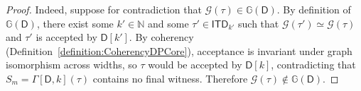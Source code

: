 \documentclass[11pt,a4paper]{article}
\newcommand{\treewidthvalue}{k}
\newcommand{\decompositiongraph}[1]{\mathcal{G}(#1)}
\newcommand{\N}{\mathbb{N}}
\newcommand{\allabstractdecompositionstreewidth}[1]{\mathsf{ITD}_{#1}}
\newcommand{\abstractdecomposition}{\tau}
\newcommand{\dpcoregraphproperty}[1]{\mathbb{G}(#1)}
\newcommand{\dpcore}{\mathsf{D}}
\newcommand{\witnessset}{S}
\newcommand{\dynamizationfunctionname}[1]{\Gamma[{#1}]}
\newcommand{\dynamizationfunction}[2]{\dynamizationfunctionname{#1,#2}}
\begin{document}
\begin{proof}
	Indeed, suppose for contradiction that $\decompositiongraph{\abstractdecomposition}\in \dpcoregraphproperty{\dpcore}$.
	By definition of $\dpcoregraphproperty{\dpcore}$, there exist some $\treewidthvalue'\in\N$ and some $\abstractdecomposition'\in \allabstractdecompositionstreewidth{\treewidthvalue'}$ such that $\decompositiongraph{\abstractdecomposition'}\simeq \decompositiongraph{\abstractdecomposition}$ and $\abstractdecomposition'$ is accepted by $\dpcore[\treewidthvalue']$.
	By coherency (Definition~\ref{definition:CoherencyDPCore}), acceptance is invariant under graph isomorphism across widths, so $\abstractdecomposition$ would be accepted by $\dpcore[\treewidthvalue]$, contradicting that $\witnessset_m=\dynamizationfunction{\dpcore}{\treewidthvalue}(\abstractdecomposition)$ contains no final witness.
	Therefore $\decompositiongraph{\abstractdecomposition}\notin \dpcoregraphproperty{\dpcore}$.



\end{proof}
\end{document}
